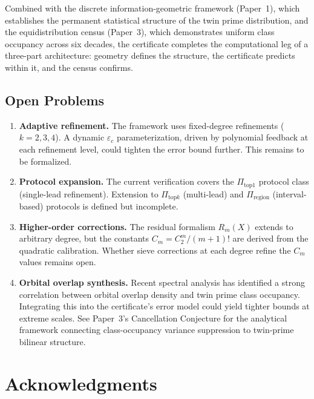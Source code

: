 \documentclass[11pt]{article}
\begin{document}
Combined with the discrete information-geometric framework (Paper~1), which
establishes the permanent statistical structure of the twin prime distribution,
and the equidistribution census (Paper~3), which demonstrates uniform class
occupancy across six decades, the certificate completes the computational
leg of a three-part architecture: geometry defines the structure, the
certificate predicts within it, and the census confirms.

\subsection{Open Problems}

\begin{enumerate}
  \item \textbf{Adaptive refinement.} The framework uses fixed-degree refinements
        ($k=2,3,4$). A dynamic $\varepsilon_c$ parameterization, driven by
        polynomial feedback at each refinement level, could tighten the error bound
        further. This remains to be formalized.

  \item \textbf{Protocol expansion.} The current verification covers the
        $\Pi_{\mathrm{top}1}$ protocol class (single-lead refinement). Extension to
        $\Pi_{\mathrm{top}k}$ (multi-lead) and $\Pi_{\mathrm{region}}$ (interval-based)
        protocols is defined but incomplete.

  \item \textbf{Higher-order corrections.} The residual formalism $R_m(X)$ extends
        to arbitrary degree, but the constants $C_m = C_2^m/(m+1)!$ are derived from
        the quadratic calibration. Whether sieve corrections at each degree refine
        the $C_m$ values remains open.

  \item \textbf{Orbital overlap synthesis.} Recent spectral analysis has identified
        a strong correlation between orbital overlap density and twin prime class
        occupancy. Integrating this into the certificate's error model could yield
        tighter bounds at extreme scales. See Paper~3's Cancellation Conjecture
        for the analytical framework connecting
        class-occupancy variance suppression to twin-prime bilinear structure.
\end{enumerate}

\section*{Acknowledgments}
\end{document}
